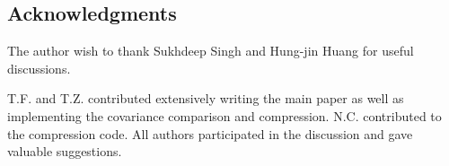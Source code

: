 \documentclass[twocolumn]{\docclass}
\begin{document}
	\subsection*{Acknowledgments}
	
	The author wish to thank Sukhdeep Singh and Hung-jin Huang for useful discussions.
	
	
	
	 
	
	T.F. and T.Z. contributed extensively writing the main paper as well as implementing the covariance comparison and compression. N.C. contributed to the compression code. All authors participated in the discussion and gave valuable suggestions.
	
	
	
	
	
	
	
	
	
	
	
	
	
\end{document}
